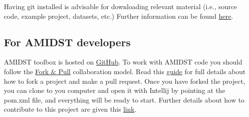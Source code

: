 \documentclass[10pt,a4paper]{article}
\begin{document}
Having git installed is advisable for downloading relevant material (i.e., source code, example project, datasets, etc.)  Further information can be found \href{https://git-scm.com/book/en/v2/Getting-Started-Installing-Git}{here}.


\subsection{For AMIDST developers }\label{for-amidst-developers}

AMIDST toolbox is hosted on
\href{https://github.com/amidst/toolbox}{GitHub}. To work with AMIDST
code you should follow the
\href{https://help.github.com/articles/using-pull-requests/}{Fork \&
	Pull} collaboration model. Read this
\href{https://guides.github.com/activities/forking/}{guide} for full
details about how to fork a project and make a pull request. Once you
have forked the project, you can clone to you computer and open it with
Intellij by pointing at the pom.xml file, and everything will be ready
to start. Further details about how to contribute to this project are given this
\href{http://amidst.github.io/toolbox/ContributingToAMIDST.html}{link}.
\end{document}

